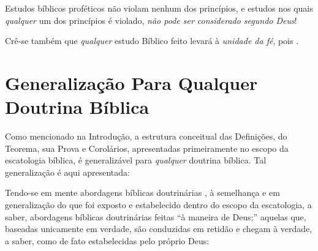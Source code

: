     Estudos bíblicos proféticos  não violam nenhum dos princípios, e estudos nos quais \emph{qualquer} um
    dos princípios é violado, \emph{não pode ser considerado segundo Deus}!

    Crê-se também que  \emph{qualquer}  estudo  Bíblico  feito    levará  à  \emph{unidade  da  fé},  pois
    .




\appendix



\section{Generalização Para Qualquer Doutrina Bíblica}

    Como mencionado na Introdução, a estrutura conceitual das Definições, do  Teorema,  sua  Prova  e  Corolários,  apresentadas
    primeiramente no escopo da escatologia bíblica, é generalizável para \emph{qualquer} doutrina bíblica. Tal  generalização  é
    aqui apresentada:

    Tendo-se em mente abordagens bíblicas doutrinárias , à semelhança e em generalização do que foi exposto
    e estabelecido dentro do escopo da escatologia, a saber, abordagens bíblicas doutrinárias feitas ``à maneira de  Deus;''
    aquelas que, baseadas unicamente  em verdade, são conduzidas em retidão e chegam à verdade, a saber, como de fato
    estabelecidas pelo próprio Deus:

